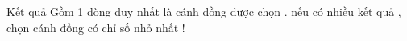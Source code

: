 Kết quả
Gồm 1 dòng duy nhất là cánh đồng được chọn . nếu có nhiều kết quả , chọn cánh đồng có chỉ số nhỏ nhất !